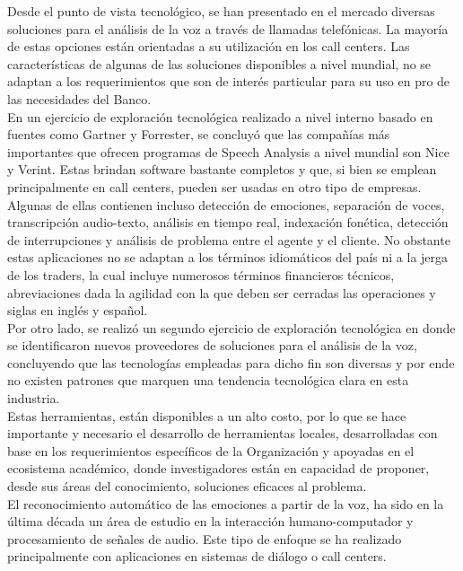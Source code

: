 \documentclass[11pt,lettersize]{article} %
\begin{document}
Desde el punto de vista tecnológico, se han presentado en el mercado diversas soluciones para el análisis de la voz a través de llamadas telefónicas. La mayoría de estas opciones están orientadas a su utilización en los call centers. Las características de algunas de las soluciones disponibles a nivel mundial, no se adaptan a los requerimientos que son de interés particular para su uso en pro de las necesidades del Banco.\\

En un ejercicio de exploración tecnológica realizado a nivel interno basado en fuentes como Gartner y Forrester, se concluyó que las compañías más importantes que ofrecen programas de Speech Analysis a nivel mundial son Nice y Verint. Estas brindan software bastante completos y que, si bien se emplean principalmente en call centers, pueden ser usadas en otro tipo de empresas. Algunas de ellas contienen incluso detección de emociones, separación de voces, transcripción audio-texto, análisis en tiempo real, indexación fonética, detección de interrupciones y análisis de problema entre el agente y el cliente. No obstante estas aplicaciones no se adaptan a los términos idiomáticos del país ni a la jerga de los traders, la cual incluye numerosos términos financieros técnicos, abreviaciones dada la agilidad con la que deben ser cerradas las operaciones y siglas en inglés y español.\\

Por otro lado, se realizó un segundo ejercicio de exploración tecnológica en donde se identificaron nuevos proveedores de soluciones para el análisis de la voz, concluyendo que las tecnologías empleadas para dicho fin son diversas y por ende no existen patrones que marquen una tendencia tecnológica clara en esta industria. \\

Estas herramientas, están disponibles a un alto costo, por lo que se hace importante y necesario el desarrollo de herramientas locales, desarrolladas con base en los requerimientos específicos de la Organización y apoyadas en el ecosistema académico, donde investigadores están en capacidad de proponer, desde sus áreas del conocimiento, soluciones eficaces al problema.\\

El reconocimiento automático de las emociones a partir de la voz, ha sido en la última década un área de estudio en la interacción humano-computador y procesamiento de señales de audio. Este tipo de enfoque se ha realizado principalmente con aplicaciones en sistemas de diálogo o call centers.\\
\end{document}
